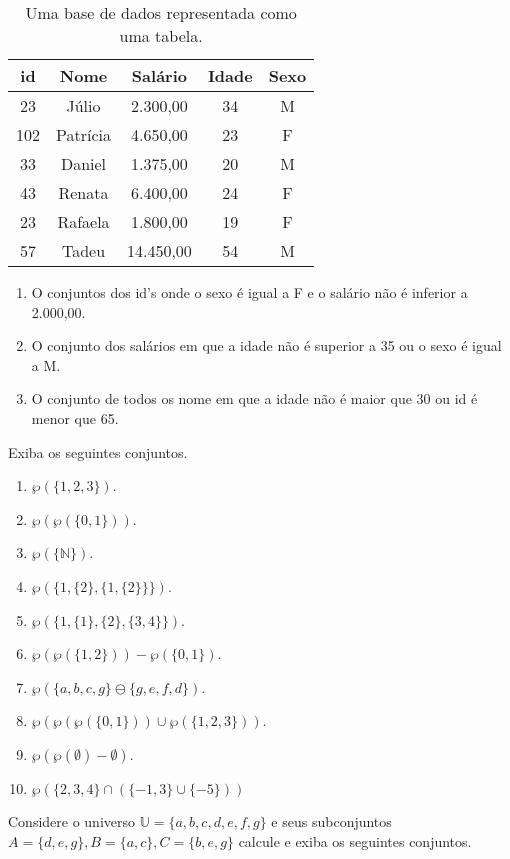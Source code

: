 \begin{problemset}
	\begin{table}[h]
		\centering
		\scriptsize
		\begin{tabular}{ccccc}
			\hline
			id & Nome & Salário & Idade & Sexo \\
			\hline
			23 & Júlio & 2.300,00 & 34 & M \\
			102 & Patrícia & 4.650,00 & 23 & F \\
			33 & Daniel & 1.375,00 & 20 & M \\
			43 & Renata & 6.400,00 & 24 & F \\
			23 & Rafaela & 1.800,00 & 19 & F \\
			57 & Tadeu & 14.450,00 & 54 & M \\
			\hline
		\end{tabular}
		\caption{Uma base de dados representada como uma tabela.}
		\label{tab:TabelaBaseDeDados1}
	\end{table}
	\begin{enumerate}
		\item O conjuntos dos id's onde o sexo é igual a F e o salário não é inferior a 2.000,00.
		\item O conjunto dos salários em que a idade não é superior a 35 ou o sexo é igual a M.
		\item O conjunto de todos os nome em que a idade não é maior que 30 ou id é menor que 65.
	\end{enumerate}
	\item Exiba os seguintes conjuntos.
	\begin{enumerate}
		\item $\wp(\{1, 2, 3\})$.
		\item $\wp(\wp(\{0,1\}))$.
		\item $\wp(\{\mathbb{N}\})$.
		\item $\wp(\{1, \{2\}, \{1, \{2\}\}\})$.
		\item $\wp(\{1, \{1\}, \{2\}, \{3, 4\}\})$.
		\item $\wp(\wp(\{1, 2\})) - \wp(\{0, 1\})$.
		\item $\wp(\{a, b, c, g\} \ominus \{g, e, f, d\})$.
		\item $\wp(\wp(\wp(\{0,1\})) \cup \wp(\{1, 2, 3\}))$.
		\item $\wp(\wp(\emptyset) - \emptyset)$.
		\item $\wp(\{2, 3, 4\} \cap (\{-1, 3\} \cup \{-5\}))$
	\end{enumerate}
	\item Considere o universo $\mathbb{U} = \{a, b, c, d, e, f, g\}$ e seus subconjuntos $A = \{d, e, g\}, B = \{a, c\}, C =\{b, e, g\}$ calcule e exiba os seguintes conjuntos.

\end{problemset}
